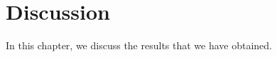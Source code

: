 \chapter{Discussion}
\label{cha:discussion}


In this chapter, we discuss the results that we have obtained.
